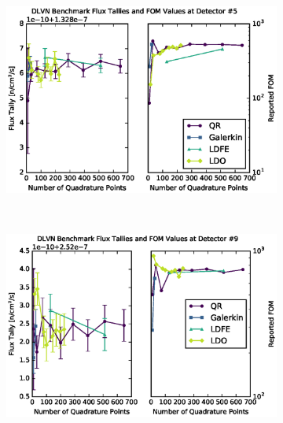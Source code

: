 \documentclass{article} %
\begin{document}
\begin{figure}[!htb]
\begin{subfigure}{\linewidth}
\centering
\includegraphics[max height=0.445\textheight]
{dlvn-fwcadis-5.eps}
\label{dlvn-fwc-5}
\end{subfigure} 
\\
\begin{subfigure}{\linewidth}
\centering
\includegraphics[max height=0.445\textheight]
{dlvn-fwcadis-9.eps}
\label{dlvn-fwc-9}
\end{subfigure}
\end{figure}
\clearpage
\end{document}
